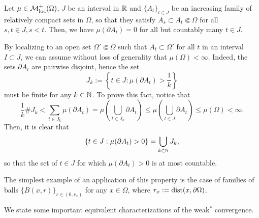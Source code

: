 \begin{remark} \label{neglcountable} Let $\mu \in \mathcal{M}^{+}_{\rm loc}(\Omega)$, $J$ be an interval in $\mathbb{R}$ and $\{A_{t}\}_{t \in J}$ be an increasing family of relatively compact sets in $\Omega$, so that they satisfy $\overline{A_{s}} \subset A_{t} \Subset \Omega$ for all $s, t \in J, s < t$. Then, we have $\mu(\partial A_{t}) = 0$ for all but countably many $t \in J$. 

By localizing to an open set $\Omega' \Subset \Omega$ such that $\overline{A_{t}} \subset \Omega'$ for all $t$ in an interval $I \subset J$, we can assume without loss of generality that $\mu(\Omega) < \infty$. Indeed, the sets $\partial A_{t}$ are pairwise disjoint, hence the set
\begin{equation*}
J_{k} := \left \{ t \in J : \mu(\partial A_{t}) > \frac{1}{k} \right \}
\end{equation*}
must be finite for any $k \in \mathbb{N}$. To prove this fact, notice that
\begin{equation*}
\frac{1}{k} \#J_{k} < \sum_{t \in J_{k}} \mu(\partial A_{t}) = \mu\left ( \bigcup_{t \in J_{k}} \partial A_{t} \right ) \le \mu \left ( \bigcup_{t \in J} \partial A_{t} \right ) \le \mu(\Omega) < \infty.
\end{equation*}
Then, it is clear that
\begin{equation*}
\left \{ t \in J : \mu(\partial A_{t}) > 0 \right \} = \bigcup_{k \in \mathbb{N}} J_{k},
\end{equation*}
so that the set of $t \in J$ for which $\mu(\partial A_{t}) > 0$ is at most countable. 

The simplest example of an application of this property is the case of families of balls $\{B(x, r)\}_{r \in (0, r_{x})}$ for any $x \in \Omega$, where $r_{x} := {\rm dist}(x, \partial \Omega)$.
\end{remark}

We state some important equivalent characterizations of the weak$^*$ convergence.

